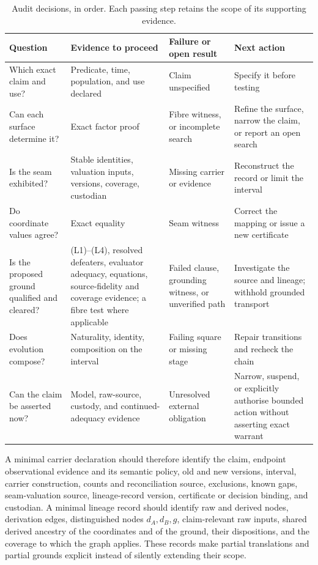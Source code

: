 \documentclass[smallextended,envcountsect,envcountsame,natbib]{svjour3}
\begin{document}
\begin{table}[htbp]
\centering\footnotesize
\caption{Audit decisions, in order. Each passing step retains the scope of its supporting evidence.}
\label{ex:tab:audit-decisions}
\begin{tabularx}{\textwidth}{@{}p{2.5cm}LLL@{}}
\toprule
Question & Evidence to proceed & Failure or open result & Next action \\
\midrule
Which exact claim and use? & Predicate, time, population, and use declared & Claim unspecified & Specify it before testing \\
Can each surface determine it? & Exact factor proof & Fibre witness, or incomplete search & Refine the surface, narrow the claim, or report an open search \\
Is the seam exhibited? & Stable identities, valuation inputs, versions, coverage, custodian & Missing carrier or evidence & Reconstruct the record or limit the interval \\
Do coordinate values agree? & Exact equality & Seam witness & Correct the mapping or issue a new certificate \\
Is the proposed ground qualified and cleared? & (L1)--(L4), resolved defeaters, evaluator adequacy, equations, source-fidelity and coverage evidence; a fibre test where applicable & Failed clause, grounding witness, or unverified path & Investigate the source and lineage; withhold grounded transport \\
Does evolution compose? & Naturality, identity, composition on the interval & Failing square or missing stage & Repair transitions and recheck the chain \\
Can the claim be asserted now? & Model, raw-source, custody, and continued-adequacy evidence & Unresolved external obligation & Narrow, suspend, or explicitly authorise bounded action without asserting exact warrant \\
\bottomrule
\end{tabularx}
\end{table}

A minimal carrier declaration should therefore identify the claim, endpoint observational evidence and its semantic policy, old and new versions, interval, carrier construction, counts and reconciliation source, exclusions, known gaps, seam-valuation source, lineage-record version, certificate or decision binding, and custodian. A minimal lineage record should identify raw and derived nodes, derivation edges, distinguished nodes $d_A,d_B,g$, claim-relevant raw inputs, shared derived ancestry of the coordinates and of the ground, their dispositions, and the coverage to which the graph applies. These records make partial translations and partial grounds explicit instead of silently extending their scope.
\end{document}
